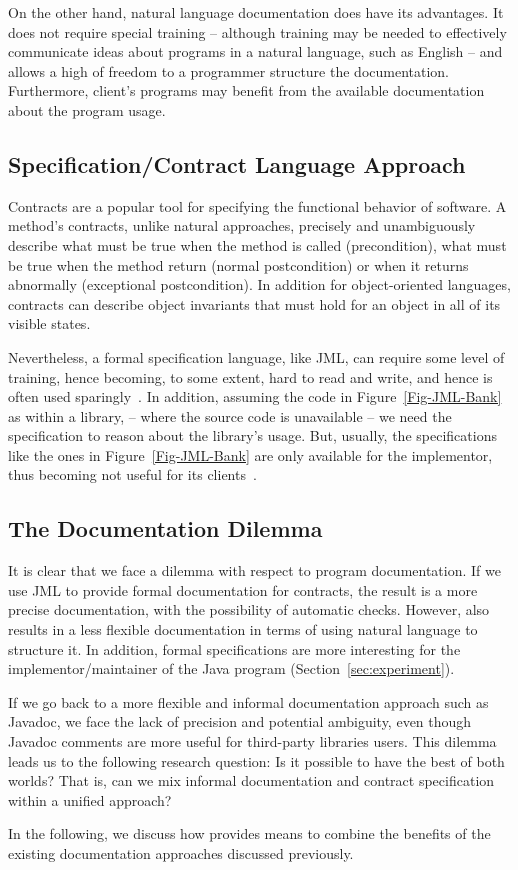 On the other hand, natural language documentation does have its advantages.
It does not require special training -- although training may be needed to effectively communicate
ideas about programs in a natural language, such as English -- and allows a high
of freedom to a programmer structure the documentation. Furthermore, client's programs may benefit from the available documentation about the program usage.


\subsection{Specification/Contract Language Approach}

Contracts are a popular tool for specifying the functional behavior of software.
A method's contracts, unlike natural approaches, precisely and unambiguously describe
what must be true when the method is called (precondition), what must be true when the method
return (normal postcondition) or when it returns abnormally (exceptional postcondition).
In addition for object-oriented languages, contracts can describe object invariants that must
hold for an object in all of its visible states.

Nevertheless, a formal specification language, like JML, can require some level of training,
hence becoming, to some extent, hard to read and write, and hence is often used
sparingly~\cite{Chalin06,Polikarpova-etal09,typeContracts}.
In addition, assuming the code in Figure~\ref{Fig-JML-Bank} as within a library, -- where the source code
is unavailable -- we need the specification to reason about the library's usage. But, usually, the
specifications like the ones in Figure~\ref{Fig-JML-Bank} are only available for the implementor, thus
becoming not useful for its clients~\cite{Parnas2011}.


\subsection{The Documentation Dilemma}

It is clear that we face a dilemma with respect to program documentation.
If we use JML to provide formal documentation for contracts, the result is a
more precise documentation, with the possibility of automatic checks. However,
also results in a less flexible documentation in terms of using natural language to structure it.
In addition, formal specifications are more interesting for the implementor/maintainer of the Java program
(Section~\ref{sec:experiment}).

If we go back to a more flexible and informal documentation approach such as Javadoc, we face the
lack of precision and potential ambiguity, even though Javadoc comments are more useful for third-party
libraries users. This dilemma leads us to the following research question: Is it possible to have
the best of both worlds? That is, can we mix informal documentation and contract specification within a unified approach?

In the following, we discuss how \contractjdoc{} provides means to combine the benefits
of the existing documentation approaches discussed previously.